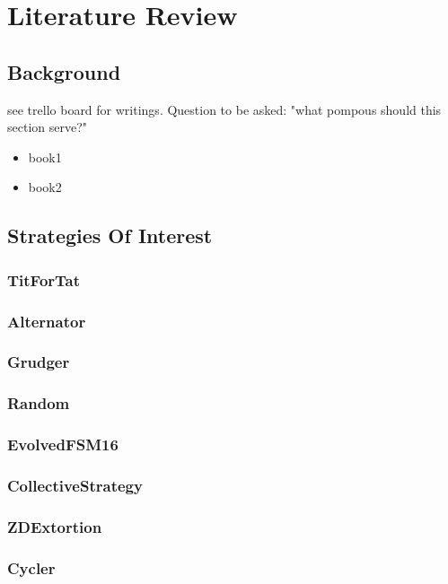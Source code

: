 
\chapter{Literature Review}\label{ch:literature}
\section{Background}\label{sec:background}
see trello board for writings.
Question to be asked: "what pompous should this section serve?"
    \begin{itemize}
        \item book1
        \item book2
        
    \end{itemize}


\section{Strategies Of Interest}\label{sec:strategiesOfInterest}
\subsection{TitForTat}\label{subsec:titfortat}
\subsection{Alternator}\label{subsec:alternator}
\subsection{Grudger}\label{subsec:grudger}
\subsection{Random}\label{subsec:random}
\subsection{EvolvedFSM16}\label{subsec:evolvedFSM16}
\subsection{CollectiveStrategy}\label{subsec:collectiveStrategy}
\subsection{ZDExtortion}\label{subsec:zdExtortion}
\subsection{Cycler}\label{subsec:cycler}